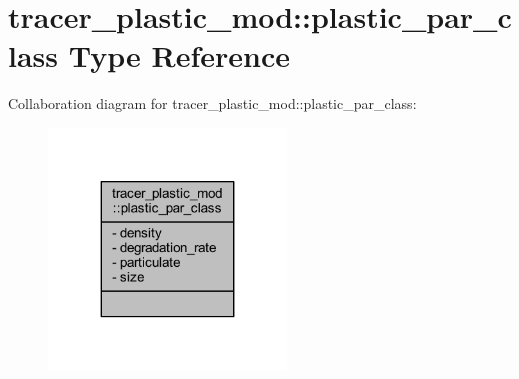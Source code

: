 \hypertarget{structtracer__plastic__mod_1_1plastic__par__class}{}\section{tracer\+\_\+plastic\+\_\+mod\+:\+:plastic\+\_\+par\+\_\+class Type Reference}
\label{structtracer__plastic__mod_1_1plastic__par__class}


Collaboration diagram for tracer\+\_\+plastic\+\_\+mod\+:\+:plastic\+\_\+par\+\_\+class\+:\nopagebreak
\begin{figure}[H]
\begin{center}
\leavevmode
\includegraphics[width=179pt]{structtracer__plastic__mod_1_1plastic__par__class__coll__graph}
\end{center}
\end{figure}
